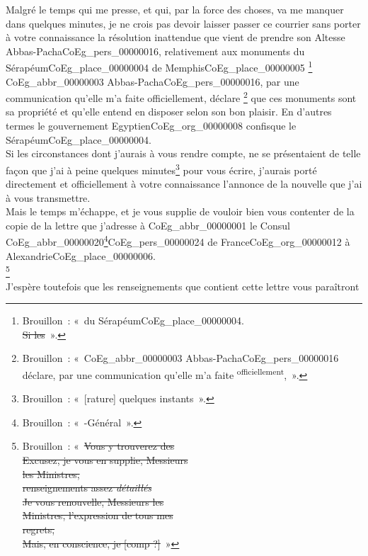 \documentclass{book}
\begin{document}
\indent Malgré le temps qui me presse, et qui, par la force des choses, va me manquer dans quelques minutes, je ne crois pas devoir laisser passer ce courrier sans porter à votre connaissance la résolution inattendue que vient de prendre son Altesse Abbas-Pacha\gls{CoEg_pers_00000016}, relativement aux monuments du Sérapéum\gls{CoEg_place_00000004} de Memphis\gls{CoEg_place_00000005} \footnote{Brouillon~: «~du Sérapéum\gls{CoEg_place_00000004}. \\
\indent \sout{Si les}~».}\\
\indent \gls{CoEg_abbr_00000003} Abbas-Pacha\gls{CoEg_pers_00000016}, par une communication qu’elle m’a faite officiellement, déclare \footnote{Brouillon~: «~\gls{CoEg_abbr_00000003} Abbas-Pacha\gls{CoEg_pers_00000016} déclare, par une communication qu’elle m’a faite \textsuperscript{officiellement},~».} que ces monuments sont sa propriété et qu’elle entend en disposer selon son bon plaisir. En d’autres termes le gouvernement Egyptien\gls{CoEg_org_00000008} confisque le Sérapéum\gls{CoEg_place_00000004}.\\
\indent Si les circonstances dont j’aurais à vous rendre compte, ne se présentaient de telle façon que j’ai à peine quelques minutes\footnote{Brouillon~: «~[rature] quelques instants~».} pour vous écrire, j’aurais porté directement et officiellement à votre connaissance l’annonce de la nouvelle que j’ai à vous transmettre.\\
\indent Mais le temps m’échappe, et je vous supplie de vouloir bien vous contenter de la copie de la
lettre que j’adresse à \gls{CoEg_abbr_00000001} le Consul \gls{CoEg_abbr_00000020}\footnote{Brouillon~: «~-Général~».}\gls{CoEg_pers_00000024} de France\gls{CoEg_org_00000012} à Alexandrie\gls{CoEg_place_00000006}.\\
\footnote{Brouillon~: «~\sout{Vous y trouverez des\\
Excusez, je vous en supplie, Messieurs\\
les Ministres,\\
renseignements assez \textit{détaillés}}\\
\indent \sout{Je vous renouvelle, Messieurs les\\
Ministres, l’expression de tous mes\\
regrets, \\
Mais, en conscience, je [comp ?]}~»}\\
\indent J’espère toutefois que les renseignements que contient cette lettre vous paraîtront\\
\end{document}
